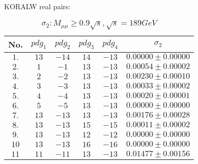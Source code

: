 \documentclass[dvips,portrait]{seminar}             %
\begin{document}
\begin{slide*}                                                %
KORALW real pairs:
{\scriptsize
\begin{table}[!ht]
\centering
\caption{\small
$\sigma_2: M_{\mu \mu} \geq 0.9\sqrt{s}, \sqrt{s}=189GeV   $ 
}
\begin{tabular}                            {||c|c|c|c|c|c||}
\hline\hline
No.             &
$pdg_1$         &
$pdg_2$         &
$pdg_3$         &
$pdg_4$         &
$\sigma_{2}$    
\\
\hline
$1.$ & $     13 $ & $    -14 $ & $     14 $ & $    -13 $ & $      0.00000\pm      0.00000$
\\
$2.$ & $      1 $ & $     -1 $ & $     13 $ & $    -13 $ & $      0.00054\pm      0.00002$
\\
$3.$ & $      2 $ & $     -2 $ & $     13 $ & $    -13 $ & $      0.00230\pm      0.00010$
\\
$4.$ & $      3 $ & $     -3 $ & $     13 $ & $    -13 $ & $      0.00033\pm      0.00002$
\\
$5.$ & $      4 $ & $     -4 $ & $     13 $ & $    -13 $ & $      0.00020\pm      0.00001$
\\
$6.$ & $      5 $ & $     -5 $ & $     13 $ & $    -13 $ & $      0.00000\pm      0.00000$
\\
$7.$ & $     13 $ & $    -13 $ & $     13 $ & $    -13 $ & $      0.00176\pm      0.00028$
\\
$8.$ & $     13 $ & $    -13 $ & $     15 $ & $    -15 $ & $      0.00011\pm      0.00002$
\\
$9.$ & $     13 $ & $    -13 $ & $     12 $ & $    -12 $ & $      0.00000\pm      0.00000$
\\
$10$ & $     13 $ & $    -13 $ & $     16 $ & $    -16 $ & $      0.00000\pm      0.00000$
\\
$11$ & $     11$ & $    -11$ & $     13$ & $    -13$ & $      0.01477\pm      0.00156$
\\
\hline\hline
\end{tabular}
\end{table}
}
\vfill
\end{slide*}   %
\end{document}
